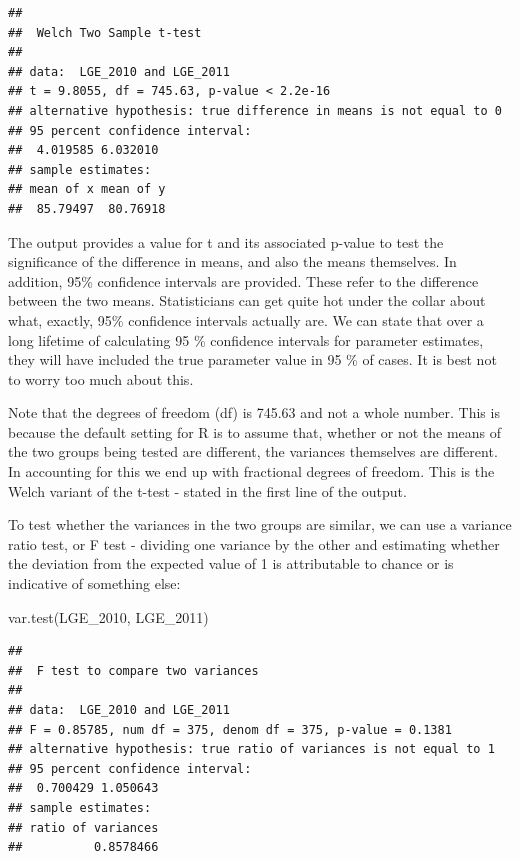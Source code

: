 \documentclass[
]{book}
\newenvironment{Shaded}{\begin{snugshade}}{\end{snugshade}}
\newcommand{\FunctionTok}[1]{\textcolor[rgb]{0.00,0.00,0.00}{#1}}
\newcommand{\NormalTok}[1]{#1}
\begin{document}
\begin{verbatim}
## 
##  Welch Two Sample t-test
## 
## data:  LGE_2010 and LGE_2011
## t = 9.8055, df = 745.63, p-value < 2.2e-16
## alternative hypothesis: true difference in means is not equal to 0
## 95 percent confidence interval:
##  4.019585 6.032010
## sample estimates:
## mean of x mean of y 
##  85.79497  80.76918
\end{verbatim}

The output provides a value for t and its associated p-value to test the significance of the difference in means, and also the means themselves. In addition, 95\% confidence intervals are provided. These refer to the difference between the two means. Statisticians can get quite hot under the collar about what, exactly, 95\% confidence intervals actually are. We can state that over a long lifetime of calculating 95 \% confidence intervals for parameter estimates, they will have included the true parameter value in 95 \% of cases. It is best not to worry too much about this.

Note that the degrees of freedom (df) is 745.63 and not a whole number. This is because the default setting for R is to assume that, whether or not the means of the two groups being tested are different, the variances themselves are different. In accounting for this we end up with fractional degrees of freedom. This is the Welch variant of the t-test - stated in the first line of the output.

To test whether the variances in the two groups are similar, we can use a variance ratio test, or F test - dividing one variance by the other and estimating whether the deviation from the expected value of 1 is attributable to chance or is indicative of something else:

\begin{Shaded}
\begin{Highlighting}[]
\FunctionTok{var.test}\NormalTok{(LGE\_2010, LGE\_2011)}
\end{Highlighting}
\end{Shaded}

\begin{verbatim}
## 
##  F test to compare two variances
## 
## data:  LGE_2010 and LGE_2011
## F = 0.85785, num df = 375, denom df = 375, p-value = 0.1381
## alternative hypothesis: true ratio of variances is not equal to 1
## 95 percent confidence interval:
##  0.700429 1.050643
## sample estimates:
## ratio of variances 
##          0.8578466
\end{verbatim}
\end{document}
